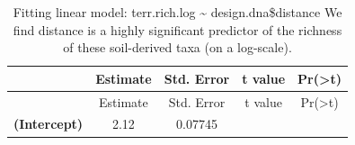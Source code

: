 \documentclass[]{article}
\begin{document}
\begin{longtable}[]{@{}ccccc@{}}
\caption{Fitting linear model: terr.rich.log \textasciitilde{}
design.dna\$distance We find distance is a highly significant predictor
of the richness of these soil-derived taxa (on a
log-scale).}\tabularnewline
\toprule
\begin{minipage}[b]{0.31\columnwidth}\centering\strut
~\strut
\end{minipage} & \begin{minipage}[b]{0.13\columnwidth}\centering\strut
Estimate\strut
\end{minipage} & \begin{minipage}[b]{0.16\columnwidth}\centering\strut
Std. Error\strut
\end{minipage} & \begin{minipage}[b]{0.12\columnwidth}\centering\strut
t value\strut
\end{minipage} & \begin{minipage}[b]{0.13\columnwidth}\centering\strut
Pr(\textgreater{}\textbar{}t\textbar{})\strut
\end{minipage}\tabularnewline
\midrule
\endfirsthead
\toprule
\begin{minipage}[b]{0.31\columnwidth}\centering\strut
~\strut
\end{minipage} & \begin{minipage}[b]{0.13\columnwidth}\centering\strut
Estimate\strut
\end{minipage} & \begin{minipage}[b]{0.16\columnwidth}\centering\strut
Std. Error\strut
\end{minipage} & \begin{minipage}[b]{0.12\columnwidth}\centering\strut
t value\strut
\end{minipage} & \begin{minipage}[b]{0.13\columnwidth}\centering\strut
Pr(\textgreater{}\textbar{}t\textbar{})\strut
\end{minipage}\tabularnewline
\midrule
\endhead
\begin{minipage}[t]{0.31\columnwidth}\centering\strut
\textbf{(Intercept)}\strut
\end{minipage} & \begin{minipage}[t]{0.13\columnwidth}\centering\strut
2.12\strut
\end{minipage} & \begin{minipage}[t]{0.16\columnwidth}\centering\strut
0.07745\strut
\end{minipage} & \begin{minipage}[t]{0.12\columnwidth}\centering\strut

\end{minipage}
\end{longtable}
\end{document}
